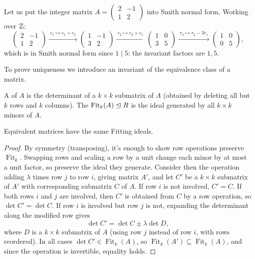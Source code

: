 \documentclass[a4paper]{scrartcl}
\begin{document}
\begin{example}
	Let us put the integer matrix $A = \begin{pmatrix} 2 & -1 \\ 1 & 2\end{pmatrix}$ into Smith normal form. Working over $\mathbb{Z}$:
	$$
	\begin{pmatrix} 2 & -1 \\ 1 & 2	\end{pmatrix}
	\xrightarrow{\;c_1 \mapsto c_1 + c_2\;}
	\begin{pmatrix} 1 & -1 \\ 3 & 2	\end{pmatrix}
	\xrightarrow{\;c_2 \mapsto c_2 + c_1\;}
	\begin{pmatrix} 1 & 0 \\ 3 & 5	\end{pmatrix}
	\xrightarrow{\;r_2 \mapsto r_2 - 3r_1\;}
	\begin{pmatrix} 1 & 0 \\ 0 & 5	\end{pmatrix},
	$$
	which is in Smith normal form since $1 \mid 5$: the invariant factors are $1, 5$.
\end{example}

To prove uniqueness we introduce an invariant of the equivalence class of a matrix.

\begin{definition}
	A  of $A$ is the determinant of a $k \times k$ submatrix of $A$ (obtained by deleting all but $k$ rows and $k$ columns). The  $\operatorname{Fit}_k(A) \trianglelefteq R$ is the ideal generated by all $k \times k$ minors of $A$.
\end{definition}

\begin{lemma}
	Equivalent matrices have the same Fitting ideals.
\end{lemma}
\begin{proof}
	By symmetry (transposing), it's enough to show row operations preserve $\operatorname{Fit}_k$. Swapping rows and scaling a row by a unit change each minor by at most a unit factor, so preserve the ideal they generate. Consider then the operation adding $\lambda$ times row $j$ to row $i$, giving matrix $A'$, and let $C'$ be a $k \times k$ submatrix of $A'$ with corresponding submatrix $C$ of $A$. If row $i$ is not involved, $C' = C$. If both rows $i$ and $j$ are involved, then $C'$ is obtained from $C$ by a row operation, so $\det C' = \det C$. If row $i$ is involved but row $j$ is not, expanding the determinant along the modified row gives
	$$
	\det C' = \det C \pm \lambda \det D,
	$$
	where $D$ is a $k \times k$ submatrix of $A$ (using row $j$ instead of row $i$, with rows reordered). In all cases $\det C' \in \operatorname{Fit}_k(A)$, so $\operatorname{Fit}_k(A') \subseteq \operatorname{Fit}_k(A)$, and since the operation is invertible, equality holds.
\end{proof}
\end{document}
